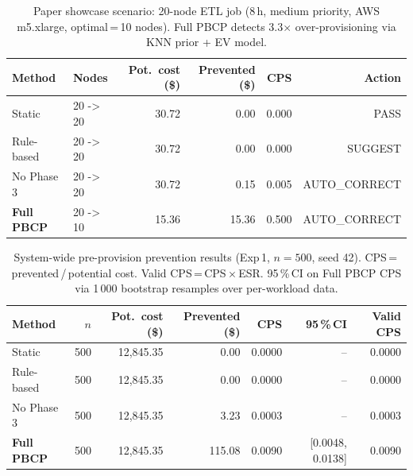 \begin{table}[t]
\centering
\caption{Paper showcase scenario: 20-node ETL job (8\,h, medium priority, AWS m5.xlarge, optimal\,=\,10 nodes). Full PBCP detects 3.3$\times$ over-provisioning via KNN prior + EV model.}
\label{tab:showcase}
\begin{tabular}{llrrrr}
\toprule
Method & Nodes & Pot.\ cost (\$) & Prevented (\$) & CPS & Action \\
\midrule
Static & 20 -> 20 & 30.72 & 0.00 & 0.000 & PASS \\
Rule-based & 20 -> 20 & 30.72 & 0.00 & 0.000 & SUGGEST \\
No Phase 3 & 20 -> 20 & 30.72 & 0.15 & 0.005 & AUTO\_CORRECT \\
\textbf{Full PBCP} & 20 -> 10 & 15.36 & 15.36 & 0.500 & AUTO\_CORRECT \\
\bottomrule
\end{tabular}
\end{table}

\begin{table}[t]
\centering
\caption{System-wide pre-provision prevention results (Exp\,1, $n=500$, seed 42). CPS\,=\,prevented\,/\,potential cost. Valid CPS\,=\,CPS\,$\times$\,ESR. 95\,\%\,CI on Full PBCP CPS via 1\,000 bootstrap resamples over per-workload data.}
\label{tab:pre_provision}
\begin{tabular}{lrrrrrr}
\toprule
Method & $n$ & Pot.\ cost (\$) & Prevented (\$) & CPS & 95\,\%\,CI & Valid CPS \\
\midrule
Static & 500 & 12,845.35 & 0.00 & 0.0000 & -- & 0.0000 \\
Rule-based & 500 & 12,845.35 & 0.00 & 0.0000 & -- & 0.0000 \\
No Phase 3 & 500 & 12,845.35 & 3.23 & 0.0003 & -- & 0.0003 \\
\textbf{Full PBCP} & 500 & 12,845.35 & 115.08 & 0.0090 & [0.0048, 0.0138] & 0.0090 \\
\bottomrule
\end{tabular}
\end{table}